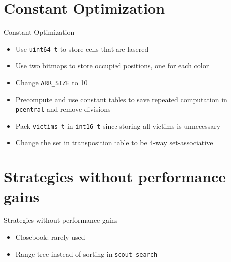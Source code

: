 \documentclass[10pt]{beamer}
\newcommand{\itema}{\item[*]}
\begin{document}
	\section{Constant Optimization}
	\begin{frame}{Constant Optimization}
        \begin{itemize}
            \itema Use {\tt uint64\_t} to store cells that are lasered
            \itema Use two bitmaps to store occupied positions, one for each color
            \itema Change {\tt ARR\_SIZE} to 10
            \itema Precompute and use constant tables to save repeated computation in {\tt pcentral} and remove divisions
            \itema Pack {\tt victims\_t} in {\tt int16\_t} since storing all victims is unnecessary
            \itema Change the set in transposition table to be 4-way set-associative
        \end{itemize}
	\end{frame}


	\section{Strategies without performance gains}
	\begin{frame}{Strategies without performance gains}
	    \begin{itemize}
	        \itema Closebook: rarely used
	        \itema Range tree instead of sorting in  {\tt scout\_search}
	    \end{itemize}
	\end{frame}
\end{document}
